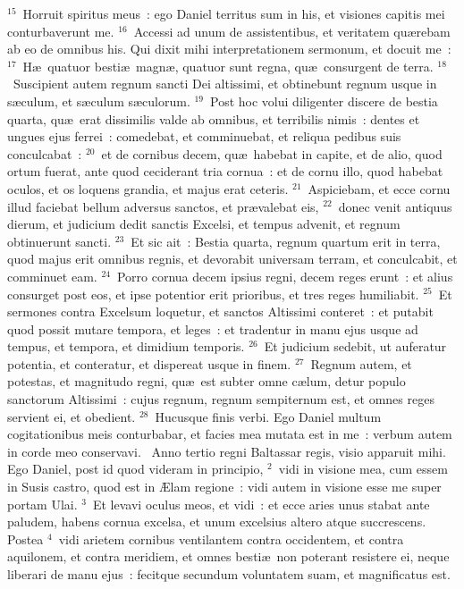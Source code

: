 ${}^{15}$~Horruit spiritus meus~: ego Daniel territus sum in his, et visiones capitis mei conturbaverunt me.
${}^{16}$~Accessi ad unum de assistentibus, et veritatem qu\ae rebam ab eo de omnibus his. Qui dixit mihi interpretationem sermonum, et docuit me~:
${}^{17}$~H\ae\ quatuor besti\ae\ magn\ae , quatuor sunt regna, qu\ae\ consurgent de terra.
${}^{18}$~Suscipient autem regnum sancti Dei altissimi, et obtinebunt regnum usque in s\ae culum, et s\ae culum s\ae culorum.
${}^{19}$~Post hoc volui diligenter discere de bestia quarta, qu\ae\ erat dissimilis valde ab omnibus, et terribilis nimis~: dentes et ungues ejus ferrei~: comedebat, et comminuebat, et reliqua pedibus suis conculcabat~:
${}^{20}$~et de cornibus decem, qu\ae\ habebat in capite, et de alio, quod ortum fuerat, ante quod ceciderant tria cornua~: et de cornu illo, quod habebat oculos, et os loquens grandia, et majus erat ceteris.
${}^{21}$~Aspiciebam, et ecce cornu illud faciebat bellum adversus sanctos, et pr\ae valebat eis,
${}^{22}$~donec venit antiquus dierum, et judicium dedit sanctis Excelsi, et tempus advenit, et regnum obtinuerunt sancti.
${}^{23}$~Et sic ait~: Bestia quarta, regnum quartum erit in terra, quod majus erit omnibus regnis, et devorabit universam terram, et conculcabit, et comminuet eam.
${}^{24}$~Porro cornua decem ipsius regni, decem reges erunt~: et alius consurget post eos, et ipse potentior erit prioribus, et tres reges humiliabit.
${}^{25}$~Et sermones contra Excelsum loquetur, et sanctos Altissimi conteret~: et putabit quod possit mutare tempora, et leges~: et tradentur in manu ejus usque ad tempus, et tempora, et dimidium temporis.
${}^{26}$~Et judicium sedebit, ut auferatur potentia, et conteratur, et dispereat usque in finem.
${}^{27}$~Regnum autem, et potestas, et magnitudo regni, qu\ae\ est subter omne c\ae lum, detur populo sanctorum Altissimi~: cujus regnum, regnum sempiternum est, et omnes reges servient ei, et obedient.
${}^{28}$~Hucusque finis verbi. Ego Daniel multum cogitationibus meis conturbabar, et facies mea mutata est in me~: verbum autem in corde meo conservavi.
~Anno tertio regni Baltassar regis, visio apparuit mihi. Ego Daniel, post id quod videram in principio,
${}^{2}$~vidi in visione mea, cum essem in Susis castro, quod est in \AE lam regione~: vidi autem in visione esse me super portam Ulai.
${}^{3}$~Et levavi oculus meos, et vidi~: et ecce aries unus stabat ante paludem, habens cornua excelsa, et unum excelsius altero atque succrescens. Postea
${}^{4}$~vidi arietem cornibus ventilantem contra occidentem, et contra aquilonem, et contra meridiem, et omnes besti\ae\ non poterant resistere ei, neque liberari de manu ejus~: fecitque secundum voluntatem suam, et magnificatus est.
